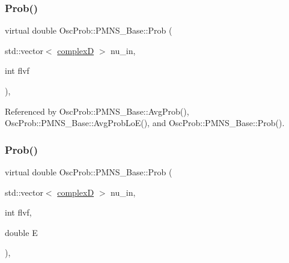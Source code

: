 \subsubsection{\texorpdfstring{Prob()}{Prob()}\hspace{0.1cm}{\footnotesize\ttfamily [1/6]}}
{\footnotesize\ttfamily virtual double Osc\+Prob\+::\+P\+M\+N\+S\+\_\+\+Base\+::\+Prob (\begin{DoxyParamCaption}\item[{std\+::vector$<$ \hyperlink{EigenPoint_8h_a67ca8e107e20610c3fff78d5e726ece0}{complexD} $>$}]{nu\+\_\+in,  }\item[{int}]{flvf }\end{DoxyParamCaption})\hspace{0.3cm}{\ttfamily [virtual]}, {\ttfamily [inherited]}}



Referenced by Osc\+Prob\+::\+P\+M\+N\+S\+\_\+\+Base\+::\+Avg\+Prob(), Osc\+Prob\+::\+P\+M\+N\+S\+\_\+\+Base\+::\+Avg\+Prob\+Lo\+E(), and Osc\+Prob\+::\+P\+M\+N\+S\+\_\+\+Base\+::\+Prob().

\mbox{\label{classOscProb_1_1PMNS__Base_ad850329a991146c82857fb31c00658f7}} 
\subsubsection{\texorpdfstring{Prob()}{Prob()}\hspace{0.1cm}{\footnotesize\ttfamily [2/6]}}
{\footnotesize\ttfamily virtual double Osc\+Prob\+::\+P\+M\+N\+S\+\_\+\+Base\+::\+Prob (\begin{DoxyParamCaption}\item[{std\+::vector$<$ \hyperlink{EigenPoint_8h_a67ca8e107e20610c3fff78d5e726ece0}{complexD} $>$}]{nu\+\_\+in,  }\item[{int}]{flvf,  }\item[{double}]{E }\end{DoxyParamCaption})\hspace{0.3cm}{\ttfamily [virtual]}, {\ttfamily [inherited]}}

\mbox{\label{classOscProb_1_1PMNS__Base_a596c89c681142e72e70844268a9a765b}} 
